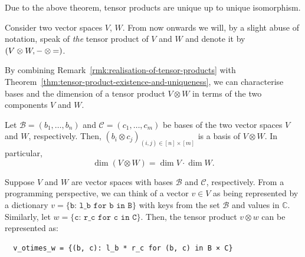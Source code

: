 \documentclass[a4paper, oneside, 12pt]{amsart}
\begin{document}
Due to the above theorem, tensor products are unique up to unique isomorphism.
\begin{notation}
  Consider two vector spaces \(V\), \(W\).
  From now onwards we will, by a slight abuse of notation, speak of \emph{the} tensor product of \(V\) and \(W\) and denote it by \((V\otimes W, {-} \otimes {=})\).
\end{notation}

By combining Remark~\ref{rmk:realisation-of-tensor-products} with Theorem~\ref{thm:tensor-product-existence-and-uniqueness}, we can characterise bases and the dimension of a tensor product \( V \otimes W \) in terms of the two components \(V\) and \(W\).

\begin{corollary}\label{cor:immediate-consequences-of-existence-of-tp}
  Let \(\mathcal{B}= (b_{1}, \dots , b_{n})\) and \( \mathcal{C} = (c_{1}, \dots , c_{m})\) be bases of the two vector spaces \(V\) and \(W\), respectively.
  Then, \((b_{i} \otimes c_{j})_{(i,j)\in [n]\times [m]}\) is a basis of \(V\otimes W\).
  In particular,
  \begin{equation}
    \dim(V\otimes W) = \dim V \cdot \dim W.
  \end{equation}

\end{corollary}

\begin{example}\label{ex:tensor-products-merging-of-dicts}
  Suppose \( V \) and \( W \) are vector spaces with bases \( \mathcal{B} \) and \( \mathcal{C} \), respectively.
  From a programming perspective, we can think of a vector \( v \in V \) as being represented by a dictionary \( v = \texttt{\{b: l\_b for b in B\}} \) with keys from the set \( \mathcal{B} \) and values in \( \mathbb{C} \).
  Similarly, let \( w = \texttt{\{c: r\_c for c in C\}} \).
  Then, the tensor product \( v \otimes w \) can be represented as:
  \begin{verbatim}
  v_otimes_w = {(b, c): l_b * r_c for (b, c) in B × C}
  \end{verbatim}
\end{example}
\end{document}
